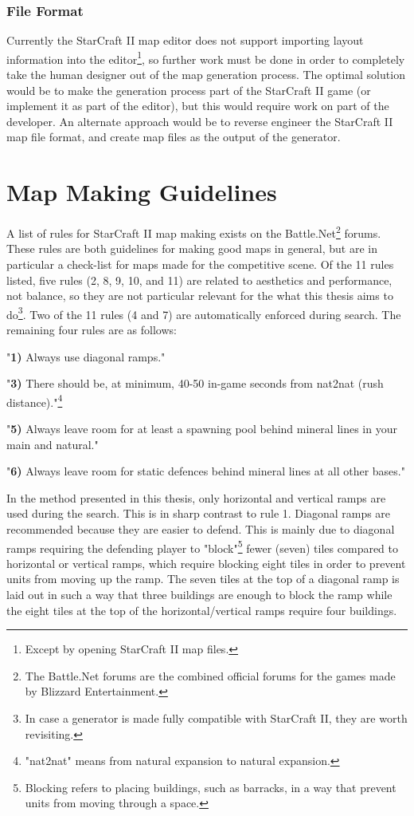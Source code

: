 \subsubsection{File Format}
Currently the StarCraft II map editor does not support importing layout information into the editor\footnote{Except by opening StarCraft II map files.}, so further work must be done in order to completely take the human designer out of the map generation process. The optimal solution would be to make the generation process part of the StarCraft II game (or implement it as part of the editor), but this would require work on part of the developer. An alternate approach would be to reverse engineer the StarCraft II map file format, and create map files as the output of the generator.

\section{Map Making Guidelines}
\label{futurework_guidelines}
A list of rules for StarCraft II map making exists on the Battle.Net\footnote{The Battle.Net forums are the combined official forums for the games made by Blizzard Entertainment.} forums\cite{blizzardrulesmapmaking}. These rules are both guidelines for making good maps in general, but are in particular a check-list for maps made for the competitive scene. Of the 11 rules listed, five rules (2, 8, 9, 10, and 11) are related to aesthetics and performance, not balance, so they are not particular relevant for the what this thesis aims to do\footnote{In case a generator is made fully compatible with StarCraft II, they are worth revisiting.}. Two of the 11 rules (4 and 7) are automatically enforced during search. The remaining four rules are as follows:

\begin{my_itemize}
\item "\textbf{1)} Always use diagonal ramps."
\item "\textbf{3)} There should be, at minimum, 40-50 in-game seconds from nat2nat (rush distance)."\footnote{"nat2nat" means from natural expansion to natural expansion.}
\item "\textbf{5)} Always leave room for at least a spawning pool behind mineral lines in your main and natural."
\item "\textbf{6)} Always leave room for static defences behind mineral lines at all other bases."
\end{my_itemize}

In the method presented in this thesis, only horizontal and vertical ramps are used during the search. This is in sharp contrast to rule 1. Diagonal ramps are recommended because they are easier to defend. This is mainly due to diagonal ramps requiring the defending player to "block"\footnote{Blocking refers to placing buildings, such as barracks, in a way that prevent units from moving through a space.} fewer (seven) tiles compared to horizontal or vertical ramps, which require blocking eight tiles in order to prevent units from moving up the ramp. The seven tiles at the top of a diagonal ramp is laid out in such a way that three buildings are enough to block the ramp while the eight tiles at the top of the horizontal/vertical ramps require four buildings.

